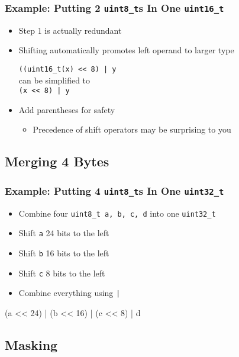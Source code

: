 \begin{frame}
  \frametitle{Example: Putting 2 \texttt{uint8\_t}s In One \texttt{uint16\_t}}
  \begin{itemize}
    \item Step 1 is actually redundant
    \item Shifting automatically promotes left operand to larger type
          \begin{center}
            \texttt{((uint16\_t(x) << 8) | y} \\[4mm]
            can be simplified to \\[4mm]
            \texttt{(x << 8) | y}
          \end{center}
    \item Add parentheses for safety
          \begin{itemize}
            \item Precedence of shift operators may be surprising to you
          \end{itemize}
  \end{itemize}
\end{frame}

\subsection{Merging 4 Bytes}
\frame{\tableofcontents[currentsubsection]}

\begin{frame}
  \frametitle{Example: Putting 4 \texttt{uint8\_t}s In One \texttt{uint32\_t}}
  \begin{itemize}
    \item Combine four \texttt{uint8\_t a, b, c, d} into one \texttt{uint32\_t}
    \item Shift \texttt{a} 24 bits to the left
    \item Shift \texttt{b} 16 bits to the left
    \item Shift \texttt{c} 8 bits to the left
    \item Combine everything using \texttt{|}
  \end{itemize}
  \begin{center} \ttfamily
    (a << 24) | (b << 16) | (c << 8) | d
  \end{center}
\end{frame}

\subsection{Masking}
\frame{\tableofcontents[currentsubsection]}

